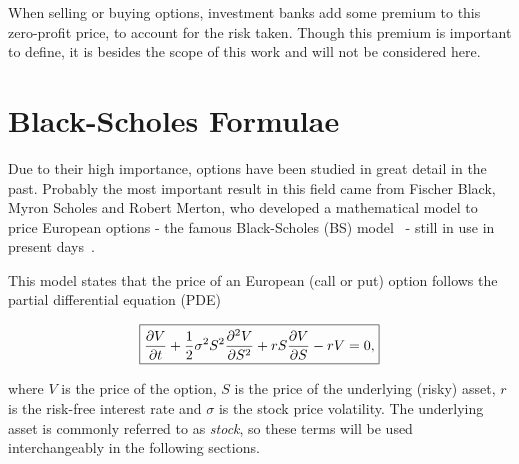 When selling or buying options, investment banks add some premium to this zero-profit price, to account for the risk taken. Though this premium is important to define, it is besides the scope of this work and will not be considered here.
    
\section{Black-Scholes Formulae}
\label{section:Black-Scholes Formulae}
Due to their high importance, options have been studied in great detail in the past.
Probably the most important result in this field came from Fischer Black, Myron Scholes and Robert Merton, who developed a mathematical model to price European options - the famous Black-Scholes (BS) model~\citep{Scholes} - still in use in present days~\citep{Wilmott3}.

This model states that the price of an European (call or put) option follows the partial differential equation (PDE)

\begin{equation}\label{BS2}
\boxed{\pdv{V}{t}+\frac{1}{2}\sigma^2S^2\pdv{^2V}{S^2}+rS\pdv{V}{S}-rV=0,}
\end{equation}

\noindent where $V$ is the price of the option, $S$ is the price of the underlying (risky) asset, $r$ is the risk-free interest rate and $\sigma$ is the stock price volatility.
The underlying asset is commonly referred to as \emph{stock}, so these terms will be used interchangeably in the following sections.

